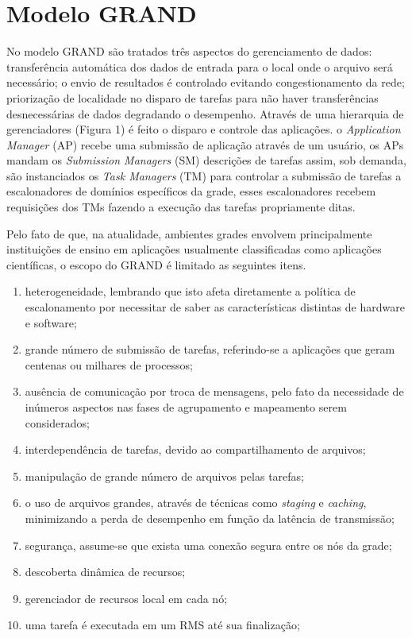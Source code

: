 \chapter{Modelo GRAND}
\label{cap:grand}

No modelo GRAND são tratados três aspectos do gerenciamento de dados: transferência automática dos dados de entrada para o local onde o arquivo será necessário; o envio de resultados é controlado evitando congestionamento da rede; priorização de localidade no disparo de tarefas para não haver transferências desnecessárias de dados degradando o desempenho. Através de uma hierarquia de gerenciadores (Figura 1) é feito o disparo e controle das aplicações. o \emph{Application Manager} (AP) recebe uma submissão de aplicação através de um usuário, os APs mandam os \emph{Submission Managers} (SM) descrições de tarefas assim, sob demanda, são instanciados os \emph{Task Managers} (TM) para controlar a submissão de tarefas a escalonadores de domínios específicos da grade, esses escalonadores recebem requisições dos TMs fazendo a execução das tarefas propriamente ditas.

Pelo fato de que, na atualidade, ambientes grades envolvem principalmente instituições de ensino em aplicações usualmente classificadas como aplicações científicas, o escopo do GRAND é limitado as seguintes itens. 

\begin{enumerate}
    \item heterogeneidade, lembrando que isto afeta diretamente a política de escalonamento por necessitar de saber as características distintas de hardware e software; 
    \item grande número de submissão de tarefas, referindo-se a aplicações que geram centenas ou milhares de processos; 
    \item ausência de comunicação por troca de mensagens, pelo fato da necessidade de inúmeros aspectos nas fases de agrupamento e mapeamento serem considerados; 
    \item interdependência de tarefas, devido ao compartilhamento de arquivos; 
    \item manipulação de grande número de arquivos pelas tarefas; 
    \item o uso de arquivos grandes, através de técnicas como \emph{staging} e \emph{caching}, minimizando a perda de desempenho em função da latência de transmissão; 
    \item segurança, assume-se que exista uma conexão segura entre os nós da grade; 
    \item descoberta dinâmica de recursos; 
    \item gerenciador de recursos local em cada nó; 
    \item uma tarefa é executada em um RMS até sua finalização;
\end{enumerate}

